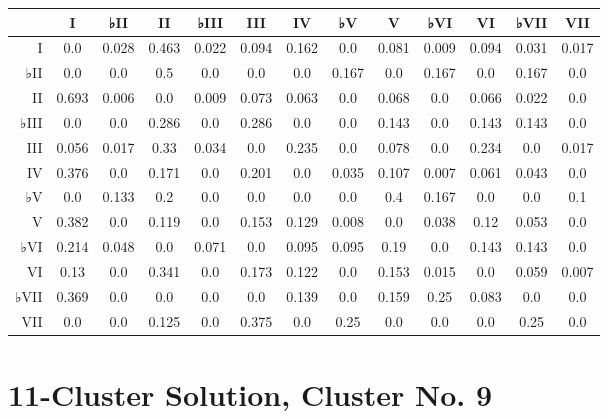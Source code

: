 \begin{table}[htbp]
\begin{minipage}{\linewidth}
\setlength{\tymax}{0.5\linewidth}
\centering
\small
\begin{tabulary}{\textwidth}{@{}RCCCCCCCCCCCC@{}} \toprule
&I&♭II&II&♭III&III&IV&♭V&V&♭VI&VI&♭VII&VII\\
\midrule
I&0.0&0.028&0.463&0.022&0.094&0.162&0.0&0.081&0.009&0.094&0.031&0.017\\
♭II&0.0&0.0&0.5&0.0&0.0&0.0&0.167&0.0&0.167&0.0&0.167&0.0\\
II&0.693&0.006&0.0&0.009&0.073&0.063&0.0&0.068&0.0&0.066&0.022&0.0\\
♭III&0.0&0.0&0.286&0.0&0.286&0.0&0.0&0.143&0.0&0.143&0.143&0.0\\
III&0.056&0.017&0.33&0.034&0.0&0.235&0.0&0.078&0.0&0.234&0.0&0.017\\
IV&0.376&0.0&0.171&0.0&0.201&0.0&0.035&0.107&0.007&0.061&0.043&0.0\\
♭V&0.0&0.133&0.2&0.0&0.0&0.0&0.0&0.4&0.167&0.0&0.0&0.1\\
V&0.382&0.0&0.119&0.0&0.153&0.129&0.008&0.0&0.038&0.12&0.053&0.0\\
♭VI&0.214&0.048&0.0&0.071&0.0&0.095&0.095&0.19&0.0&0.143&0.143&0.0\\
VI&0.13&0.0&0.341&0.0&0.173&0.122&0.0&0.153&0.015&0.0&0.059&0.007\\
♭VII&0.369&0.0&0.0&0.0&0.0&0.139&0.0&0.159&0.25&0.083&0.0&0.0\\
VII&0.0&0.0&0.125&0.0&0.375&0.0&0.25&0.0&0.0&0.0&0.25&0.0\\

\bottomrule

\end{tabulary}
\end{minipage}
\end{table}

\section{11-Cluster Solution, Cluster No. 9}
\label{11-clustersolutionclusterno.9}

